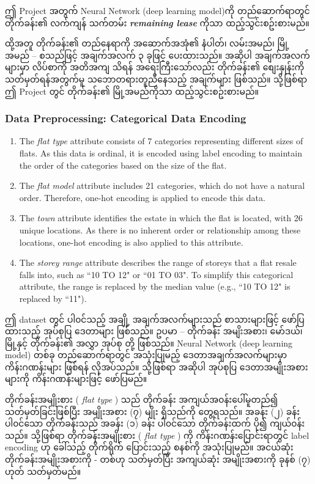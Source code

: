 ဤ Project အတွက် Neural Network (deep learning model)ကို တည်ဆောက်ရာတွင် တိုက်ခန်း၏ လက်ကျန် သက်တမ်း \textit{\textbf{remaining lease}} ကိုသာ ထည့်သွင်းစဥ်းစားမည်။ 

ထို့အတူ တိုက်ခန်း၏ တည်နေရာကို အဆောက်အအုံ၏ နံပါတ်၊ လမ်းအမည်၊ မြို့အမည် -- စသည်ဖြင့် အချက်အလက် ၃ ခုဖြင့် ပေးထားသည်။ အဆိုပါ အချက်အလက်များမှာ လိပ်စာကို အတိအကျ သိရန် အရေးကြီးသော်လည်း တိုက်ခန်း၏ စျေးနှုန်းကို သတ်မှတ်ရန်အတွက်မူ သဘောတရားတူညီနေသည့် အချက်များ ဖြစ်သည်။ သို့ဖြစ်ရာ ဤ Project တွင် တိုက်ခန်း၏ မြို့အမည်ကိုသာ ထည့်သွင်းစဥ်းစားမည်။  


\subsubsection{Data Preprocessing: Categorical Data Encoding}
\begin{enumerate}
    \item The \textit{flat type} attribute consists of 7 categories representing different sizes of flats. As this data is ordinal, it is encoded using label encoding to maintain the order of the categories based on the size of the flat.
    \item The \textit{flat model} attribute includes 21 categories, which do not have a natural order. Therefore, one-hot encoding is applied to encode this data.
    \item The \textit{town} attribute identifies the estate in which the flat is located, with 26 unique locations. As there is no inherent order or relationship among these locations, one-hot encoding is also applied to this attribute.
    \item The \textit{storey range} attribute describes the range of storeys that a flat resale falls into, such as ``10 TO 12" or ``01 TO 03". To simplify this categorical attribute, the range is replaced by the median value (e.g., ``10 TO 12" is replaced by ``11").
\end{enumerate}

ဤ dataset တွင်  ပါ၀င်သည့် အချို့ အချက်အလက်များသည် စာသားများဖြင့် ဖော်ပြထားသည့် အုပ်စုပြ ဒေတာများ ဖြစ်သည်။ ဥပမာ -- တိုက်ခန်း အမျိးအစား၊ မော်ဒယ်၊ မြို့နှင့် တိုက်ခန်း၏ အလွှာ အုပ်စု တို့ ဖြစ်သည်။ Neural Network (deep learning model) တစ်ခု တည်ဆောက်ရာတွင် အသုံးပြုမည့် ဒေတာအချက်အလက်များမှာ ကိန်းဂဏန်းများ ဖြစ်ရန် လိုအပ်သည်။ သို့ဖြစ်ရာ အဆိုပါ အုပ်စုပြ ဒေတာအမျိုးအစားများကို ကိန်းဂဏန်းများဖြင့် ဖော်ပြမည်။ 

တိုက်ခန်းအမျိုးစား ( \textit{flat type} ) သည် တိုက်ခန်း အကျယ်အ၀န်းပေါ်မူတည်၍ သတ်မှတ်ခြင်းဖြစ်ပြီး အမျိုးအစား (၇) မျိုး ရှိသည်ကို တွေ့ရသည်။ အခန်း (၂) ခန်းပါ၀င်သော တိုက်ခန်းသည် အခန်း (၁) ခန်း ပါ၀င်သော တိုက်ခန်းထက် ပို၍ ကျယ်၀န်းသည်။ သို့ဖြစ်ရာ တိုက်ခန်းအမျိုးစား ( \textit{flat type} ) ကို ကိန်းဂဏန်းပြောင်းရာတွင် label encoding ဟု ခေါ်သည့် တိုက်ရိုက် ပြောင်းသည့် စနစ်ကို အသုံးပြုမည်။ အငယ်ဆုံးတိုက်ခန်းအမျိုးအစားကို - တစ်ဟု သတ်မှတ်ပြီး အကျယ်ဆုံး အမျိုးအစားကို ခုနစ် (၇) ဟုတ် သတ်မှတ်မည်။ 

